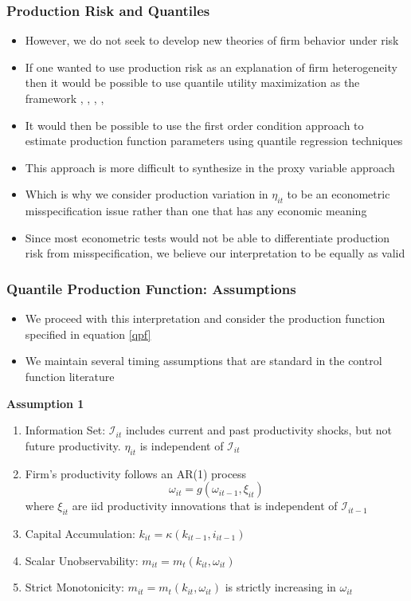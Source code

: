 \documentclass{beamer}
\begin{document}

\begin{frame}
\frametitle{Production Risk and Quantiles}
\begin{itemize}
	\item However, we do not seek to develop new theories of firm behavior under risk
	\item If one wanted to use production risk as an explanation of firm heterogeneity then it would be possible to use quantile utility maximization as the framework \parencite{Manski1988}, \parencite{Bhattacharya2009}, \parencite{ROSTEK2009}, \parencite{Chambers2007}, \parencite{Castro2017}
	\item It would then be possible to use the first order condition approach to estimate production function parameters using quantile regression techniques
	\item This approach is more difficult to synthesize in the proxy variable approach
	\item Which is why we consider production variation in $\eta_{it}$ to be an econometric misspecification issue rather than one that has any economic meaning
	\item Since most econometric tests would not be able to differentiate production risk from misspecification, we believe our interpretation to be equally as valid
\end{itemize}
\end{frame}


\begin{frame}
\frametitle{Quantile Production Function: Assumptions}
\begin{itemize}
	\item We proceed with this interpretation and consider the production function specified in equation \eqref{qpf}
	\item We maintain several timing assumptions that are standard in the control function literature
\end{itemize}
\textbf{Assumption 1}
\begin{enumerate}
	\item Information Set: $\mathcal{I}_{it}$ includes current and past productivity shocks, but not future productivity. $\eta_{it}$ is independent of $\mathcal{I}_{it}$
	\item Firm's productivity follows an AR(1) process
	\begin{equation}
		\omega_{it}=g(\omega_{it-1}, \xi_{it})
	\end{equation}
	where $\xi_{it}$ are iid productivity innovations that is independent of $\mathcal{I}_{it-1}$
	\item Capital Accumulation: $k_{it}=\kappa(k_{it-1}, i_{it-1})$
	\item Scalar Unobservability: $m_{it}=m_{t}(k_{it}, \omega_{it})$
	\item Strict Monotonicity: $m_{it}=m_{t}(k_{it}, \omega_{it})$ is strictly increasing in $\omega_{it}$
\end{enumerate}
\end{frame}
\end{document}
